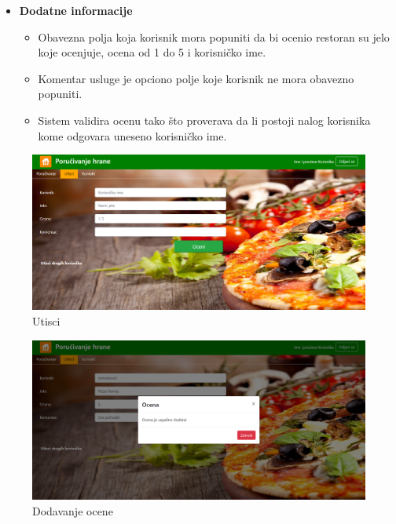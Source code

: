 \begin{itemize}
     \item \textbf{Dodatne informacije}
 \begin{itemize}
     \item Obavezna polja koja korisnik mora popuniti da bi ocenio restoran su jelo koje ocenjuje, ocena od 1 do 5 i korisni\v cko ime.
     \item Komentar usluge je opciono polje koje korisnik ne mora obavezno popuniti.
    \item Sistem validira ocenu tako što proverava da li postoji nalog korisnika kome odgovara uneseno korisničko ime.
 \end{itemize}
 \end{itemize}
 \begin{figure}[!h]
    \includegraphics[width=1\textwidth]{slike/utisci.png}
    \caption{Utisci} %
    \label{fig:slika_utisci}
\end{figure}

 \begin{figure}[!h]
    \includegraphics[width=1\textwidth]{slike/utisci1.png}

    \caption{Dodavanje ocene} %
    \label{fig:slika_utisci1}
\end{figure}

